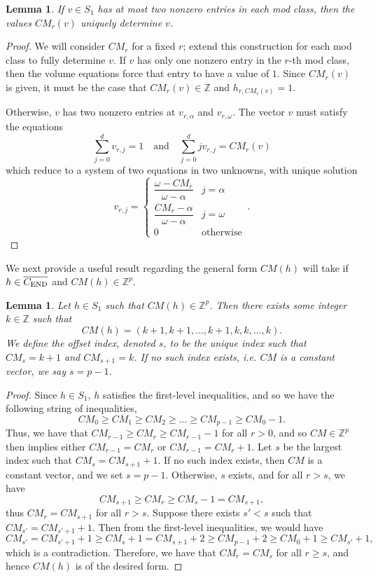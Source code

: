 \documentclass[12pt]{amsart}
\newtheorem{lemma}[thm]{Lemma}
\theoremstyle{definition}
\numberwithin{equation}{section}
\renewcommand\>{\rangle}
\newcommand\<{\langle}
\newcommand\0{\mathbf{0}}
\newcommand\ZZ{\mathbb{Z}}
\newcommand{\CEND}{C_\textnormal{END}}
\begin{document}
\begin{lemma}\label{l:determined_h}
If $v \in S_1$ has at most two nonzero entries in each mod class, then the values $CM_r(v)$ uniquely determine $v$.
\end{lemma}
\begin{proof}
	We will consider $CM_r$ for a fixed $r$; extend this construction for each mod class to fully determine $v$.
	If $v$ has only one nonzero entry in the $r$-th mod class, then the volume equations force that entry to have a value of $1$.
	Since $CM_r(v)$ is given, it must be the case that $CM_r(v) \in \ZZ$ and $h_{r, CM_r(v)} = 1$.
	
	Otherwise, $v$ has two nonzero entries at $v_{r,\alpha}$ and $v_{r, \omega}$. 
	The vector $v$ must satisfy the equations
	\[\sum_{j=0}^d v_{r,j} = 1 \quad \text{and} \quad \sum_{j=0}^d jv_{r,j} = CM_r(v)\]
	which reduce to a system of two equations in two unknowns, with unique solution
	\begin{equation}\label{eq:determined_h}
		v_{r,j} = \begin{cases}
			\dfrac{\omega - CM_r}{\omega - \alpha} & j = \alpha\\[1em]
			\dfrac{CM_r - \alpha}{\omega - \alpha} & j = \omega\\[1em]
			0 & \text{otherwise} 
		\end{cases}\, .
	\end{equation}
\end{proof}

We next provide a useful result regarding the general form $CM(h)$ will take if $h \in \overline{\CEND}$ and $CM(h) \in \ZZ^p$.

\begin{lemma}\label{l:integer_CM}
	Let $h \in S_1$ such that $CM(h) \in \ZZ^p$. Then there exists some integer $k \in \ZZ$ such that
	\[CM(h) = (k+1,k+1,\dots,k+1, k,k,\dots,k).\]
	We define the \emph{offset index}, denoted $s$, to be the unique index such that $CM_s = k+1$ and $CM_{s+1} = k$. If no such index exists, i.e. $CM$ is a constant vector, we say $s = p-1$.
\end{lemma}
\begin{proof}
	Since $h \in S_1$, $h$ satisfies the first-level inequalities, and so we have the following string of inequalities,
	\[CM_0 \geq CM_1 \geq CM_2 \geq \dots \geq CM_{p-1} \geq CM_0 - 1.\]
	Thus, we have that $CM_{r-1} \geq CM_{r} \geq CM_{r-1} - 1$ for all $r > 0$, and so $CM \in \ZZ^p$ then implies either $CM_{r-1} = CM_{r}$ or $CM_{r-1} = CM_r + 1$. Let $s$ be the largest index such that $CM_{s} = CM_{s+1} + 1$. If no such index exists, then $CM$ is a constant vector, and we set $s = p-1$. Otherwise, $s$ exists, and for all $r > s$, we have 
	\[CM_{s+1} \geq CM_{r} \geq CM_{s} - 1 = CM_{s+1},\]
	thus $CM_r = CM_{s+1}$ for all $r > s$. Suppose there exists $s' < s$ such that $CM_{s'} = CM_{s'+1} + 1$. Then from the first-level inequalities, we would have 
	\[CM_{s'} = CM_{s' + 1} +1 \geq CM_{s} + 1 = CM_{s+1} + 2 \geq CM_{p-1} + 2 \geq CM_{0}+ 1 \geq CM_{s'} + 1, \]
	which is a contradiction. Therefore, we have that $CM_r = CM_{s}$ for all $r \geq s$, and hence $CM(h)$ is of the desired form.
\end{proof}
\end{document}
